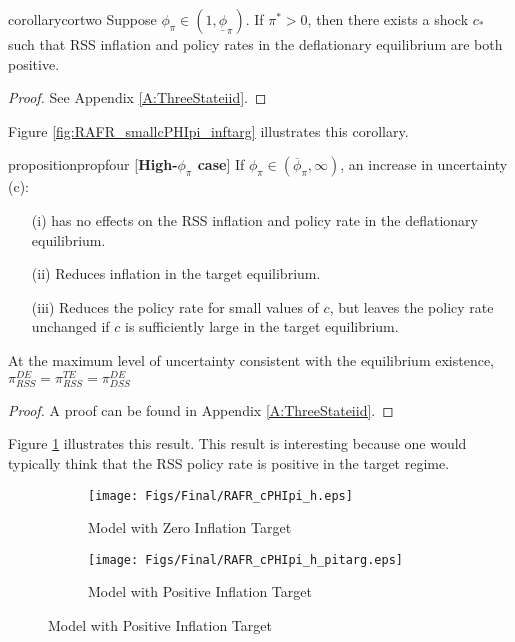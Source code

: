 \documentclass[11pt]{article}
\begin{document}
	\begin{restatable}{corollary}{cortwo}
		Suppose $\phi_{\pi}\in(1,\underline{\phi}_{\pi})$. If $\pi^* > 0$, then there exists a shock $c_*$ such that RSS inflation and policy rates in the deflationary equilibrium are both positive. 
	\end{restatable}
	\begin{proof}
		See Appendix \ref{A:ThreeStateiid}.
	\end{proof}
	
	Figure \ref{fig:RAFR_smallcPHIpi_inftarg} illustrates this corollary. 
	
	
	\begin{restatable}{proposition}{propfour}\label{prop:prop4}
		[\textbf{High-$\phi_{\pi}$ case}] If $\phi_{\pi}\in(\overline{\phi}_{\pi},\infty)$, an increase in uncertainty (c):
		\begin{itemize}
			\item[(i)] has no effects on the RSS inflation and policy rate in the deflationary equilibrium.
			\item[(ii)]  Reduces inflation in the target equilibrium.
			\item[(iii)] Reduces the policy rate for small values of $c$, but leaves the policy rate unchanged if $c$ is sufficiently large in the target equilibrium.
		\end{itemize}
		At the maximum level of uncertainty consistent with the equilibrium existence, $\pi_{RSS}^{DE} = \pi_{RSS}^{TE} = \pi_{DSS}^{DE}$
	\end{restatable}
	\begin{proof}
		A proof can be found in Appendix \ref{A:ThreeStateiid}.
	\end{proof}
	
	Figure \ref{fig:RAFR_largecPHIpi} illustrates this result. This result is interesting because one would typically think that the RSS policy rate is positive in the target regime. 
	
	\begin{figure}[t]
		\caption{Risky Steady States: $\phi_{\pi}\in(\overline{\phi}_{\pi},\infty)$}
		\begin{center}
			\begin{subfigure}[b]{0.499\textwidth}
				\centering
				\texttt{[image: Figs/Final/RAFR\_cPHIpi\_h.eps]}
				\caption{Model with Zero Inflation Target}
				\label{fig:RAFR_largecPHIpi}
			\end{subfigure}
			\begin{subfigure}[b]{0.49\textwidth}
				\centering
				\texttt{[image: Figs/Final/RAFR\_cPHIpi\_h\_pitarg.eps]}
				\caption{Model with Positive Inflation Target}
				\label{fig:RAFR_largecPHIpi_inftarg}
			\end{subfigure}
		\end{center}
	\end{figure}
		
\end{document}
